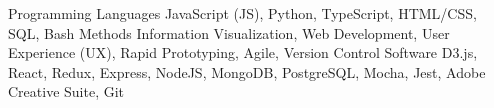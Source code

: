 	\begin{cvskills}
		\cvskill
      		{Programming Languages}
      		{JavaScript (JS), Python, TypeScript, HTML/CSS, SQL, Bash}
		\cvskill
			{Methods}
			{Information Visualization, Web Development, User Experience (UX), Rapid Prototyping, Agile, Version Control}
		\cvskill
			{Software}
			{D3.js, React, Redux, Express, NodeJS, MongoDB, PostgreSQL, Mocha, Jest, Adobe Creative Suite, Git}
	\end{cvskills}
